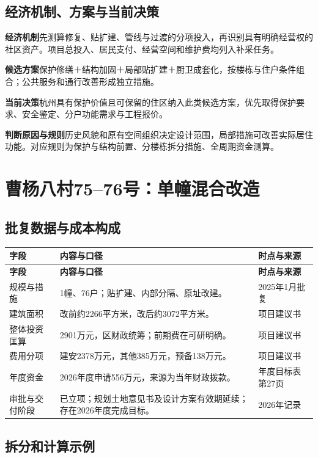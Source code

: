 \documentclass[UTF8,11pt,fontset=windows]{ctexart}
\newcommand{\field}[2]{\par\noindent\textbf{#1}\quad #2\par}
\begin{document}
\subsection{经济机制、方案与当前决策}

\field{经济机制}{先测算修复、贴扩建、管线与过渡的分项投入，再识别具有明确经营权的社区资产。项目总投入、居民支付、经营空间和维护费均列入补采任务。}
\field{候选方案}{保护修缮＋结构加固＋局部贴扩建＋厨卫成套化，按楼栋与住户条件组合；公共服务和通行改善形成独立措施。}
\field{当前决策}{杭州具有保护价值且可保留的住区纳入此类候选方案，优先取得保护要求、安全鉴定、分户功能需求与工程报价。}
\field{判断原因与规则}{历史风貌和原有空间组织决定设计范围，局部措施可改善实际居住功能。对应规则为保护与结构前置、分楼栋拆分措施、全周期资金测算。}

\clearpage
\section{曹杨八村75--76号：单幢混合改造}

\subsection{批复数据与成本构成}

\begin{longtable}{@{}L{41mm}L{84mm}L{34mm}@{}}
\toprule\textbf{字段} & \textbf{内容与口径} & \textbf{时点与来源}\\\midrule
\endfirsthead
\toprule\textbf{字段} & \textbf{内容与口径} & \textbf{时点与来源}\\\midrule
\endhead
规模与措施 & 1幢、76户；贴扩建、内部分隔、原址改建。 & 2025年1月批复\cite{S06}\\
建筑面积 & 改前约2266平方米，改后约3072平方米。 & 项目建议书\cite{S06}\\
整体投资匡算 & 2901万元，区财政统筹；前期费在可研明确。 & 项目建议书\cite{S06}\\
费用分项 & 建安2378万元，其他385万元，预备138万元。 & 项目建议书\cite{S06}\\
年度资金 & 2026年度申请556万元，来源为当年财政拨款。 & 年度目标表第27页\cite{S09}\\
审批与交付阶段 & 已立项；规划土地意见书及设计方案有效期延续；存在2026年度完成目标。 & 2026年记录\cite{S07,S08,S09}\\
\bottomrule
\end{longtable}

\subsection{拆分和计算示例}
\end{document}
